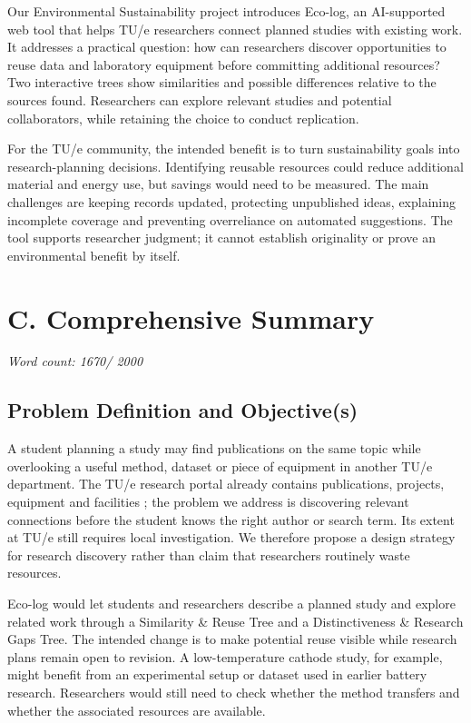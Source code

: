 \documentclass[11pt,a4paper]{article}
\newcommand{\Cwordcount}{1670}
\begin{document}
\noindent Our Environmental Sustainability project introduces Eco-log, an AI-supported web tool that helps TU/e researchers connect planned studies with existing work. It addresses a practical question: how can researchers discover opportunities to reuse data and laboratory equipment before committing additional resources? Two interactive trees show similarities and possible differences relative to the sources found. Researchers can explore relevant studies and potential collaborators, while retaining the choice to conduct replication.

For the TU/e community, the intended benefit is to turn sustainability goals into research-planning decisions. Identifying reusable resources could reduce additional material and energy use, but savings would need to be measured. The main challenges are keeping records updated, protecting unpublished ideas, explaining incomplete coverage and preventing overreliance on automated suggestions. The tool supports researcher judgment; it cannot establish originality or prove an environmental benefit by itself.
\clearpage

\section*{C. Comprehensive Summary}
\noindent\textit{Word count: \Cwordcount / 2000}\par\medskip

\subsection*{Problem Definition and Objective(s)}

A student planning a study may find publications on the same topic while overlooking a useful method, dataset or piece of equipment in another TU/e department. The TU/e research portal already contains publications, projects, equipment and facilities \citep{tueportal}; the problem we address is discovering relevant connections before the student knows the right author or search term. Its extent at TU/e still requires local investigation. We therefore propose a design strategy for research discovery rather than claim that researchers routinely waste resources.

Eco-log would let students and researchers describe a planned study and explore related work through a Similarity \& Reuse Tree and a Distinctiveness \& Research Gaps Tree. The intended change is to make potential reuse visible while research plans remain open to revision. A low-temperature cathode study, for example, might benefit from an experimental setup or dataset used in earlier battery research. Researchers would still need to check whether the method transfers and whether the associated resources are available.
\end{document}
